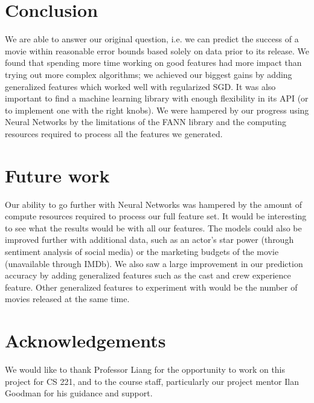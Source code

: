 \documentclass[journal]{IEEEtran}
\begin{document}
\section{Conclusion}
We are able to answer our original question, i.e. we can predict the success of a movie within reasonable error bounds based solely on data prior to its release.
We found that spending more time working on good features had more impact than trying out more complex algorithms; we achieved our biggest gains by adding generalized features which worked well with regularized SGD. It was also important to find a machine learning library with enough flexibility in its API (or to implement one with the right knobs). We were hampered by our progress using Neural Networks by the limitations of the FANN library and the computing resources required to process all the features we generated.

\section{Future work}
Our ability to go further with Neural Networks was hampered by the amount of
compute resources required to process our full feature set. It would be
interesting to see what the results would be with all our features. The models
could also be improved further with additional data, such as an actor's star
power (through sentiment analysis of social media) or the marketing budgets of
the movie (unavailable through IMDb). We also saw a large improvement in our
prediction accuracy by adding generalized features such as the cast and crew
experience feature. Other generalized features to experiment with would be the
number of movies released at the same time.

\section{Acknowledgements}
We would like to thank Professor Liang for the opportunity to work on this
project for CS 221, and to the course staff, particularly our project mentor
Ilan Goodman for his guidance and support.
\end{document}

